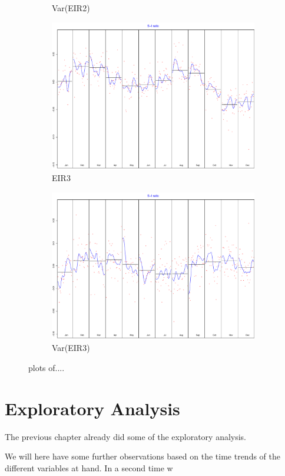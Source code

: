 \documentclass[12pt,a4paper,oneside]{book}
\begin{document}
\begin{figure}
\begin{subfigure}{.5\textwidth}
  \caption{Var(EIR2)}
\end{subfigure}
\begin{subfigure}{.5\textwidth}
  \centering
  \includegraphics[width=.8\linewidth]{Graphs/S-I_7.pdf}
  \caption{EIR3}
\end{subfigure}
\begin{subfigure}{.5\textwidth}
  \centering
  \includegraphics[width=.8\linewidth]{Graphs/S-I_8.pdf}
  \caption{Var(EIR3)}
\end{subfigure}
\caption{plots of....}
\label{fig:S-I seasonal correction RJDemetra}
\end{figure}





\chapter{Exploratory Analysis}

The previous chapter already did some of the exploratory analysis.

We will here have some further observations based on the time trends of the different variables at hand.
In a second time w
\end{document}
